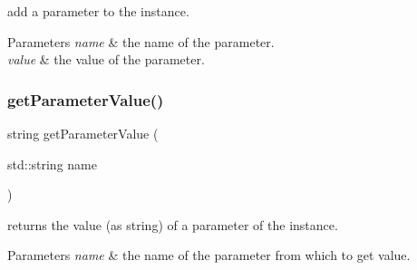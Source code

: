 add a parameter to the instance. 


\begin{DoxyParams}{Parameters}
{\em name} & the name of the parameter. \\
\hline
{\em value} & the value of the parameter. \\
\hline
\end{DoxyParams}
\mbox{\label{class_s_p_i_c_e_1_1_instance_a324e4ff99afdcd5972d8c57461d12ef5}} 
\subsubsection{\texorpdfstring{get\+Parameter\+Value()}{getParameterValue()}}
{\footnotesize\ttfamily string get\+Parameter\+Value (\begin{DoxyParamCaption}\item[{std\+::string}]{name }\end{DoxyParamCaption})}



returns the value (as string) of a parameter of the instance. 


\begin{DoxyParams}{Parameters}
{\em name} & the name of the parameter from which to get value. \\
\hline
\end{DoxyParams}
